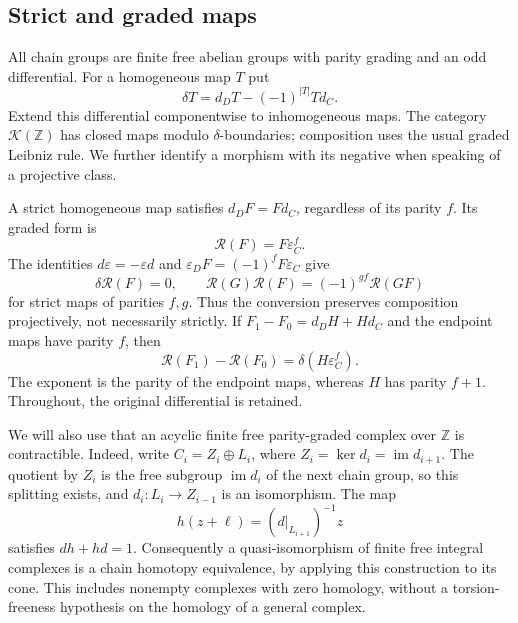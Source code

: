 \documentclass[11pt]{amsart}
\theoremstyle{definition}
\theoremstyle{remark}
\theoremstyle{plain}
\newcommand{\ZZ}{\mathbb Z}
\newcommand{\eps}{\varepsilon}
\newcommand{\cK}{\mathcal K}
\begin{document}
\subsection{Strict and graded maps}\label{sec:algebra}
All chain groups are finite free abelian groups with parity grading
and an odd differential. For a homogeneous map $T$ put
\[
 \delta T=d_DT-(-1)^{|T|}Td_C.
\]
Extend this differential componentwise to inhomogeneous maps.
The category $\cK(\ZZ)$ has closed maps modulo $\delta$-boundaries;
composition uses the usual graded Leibniz rule. We further identify
a morphism with its negative when speaking of a projective class.

A strict homogeneous map satisfies $d_DF=Fd_C$, regardless of its
parity $f$. Its graded form is
\begin{equation}\label{eq:right}
 \mathcal R(F)=F\eps_C^f.
\end{equation}
The identities $d\eps=-\eps d$ and
$\eps_DF=(-1)^fF\eps_C$ give
\begin{equation}\label{eq:right-comp}
 \delta\mathcal R(F)=0,
 \qquad \mathcal R(G)\mathcal R(F)=(-1)^{gf}\mathcal R(GF)
\end{equation}
for strict maps of parities $f,g$. Thus the conversion preserves
composition projectively, not necessarily strictly. If
$F_1-F_0=d_DH+Hd_C$ and the endpoint maps have parity $f$, then
\begin{equation}\label{eq:right-homotopy}
 \mathcal R(F_1)-\mathcal R(F_0)=\delta(H\eps_C^f).
\end{equation}
The exponent is the parity of the endpoint maps, whereas $H$ has
parity $f+1$. Throughout, the original differential is retained.

We will also use that an acyclic finite free parity-graded complex
over $\ZZ$ is contractible. Indeed, write $C_i=Z_i\oplus L_i$,
where $Z_i=\ker d_i=\operatorname{im}d_{i+1}$. The quotient by
$Z_i$ is the free subgroup $\operatorname{im}d_i$ of the next
chain group, so this splitting exists, and $d_i:L_i\to Z_{i-1}$
is an isomorphism. The map
\begin{equation}\label{eq:contraction}
 h(z+\ell)=(d|_{L_{i+1}})^{-1}z
\end{equation}
satisfies $dh+hd=1$. Consequently a quasi-isomorphism of finite
free integral complexes is a chain homotopy equivalence, by applying
this construction to its cone. This includes nonempty complexes
with zero homology, without a torsion-freeness hypothesis on the
homology of a general complex.
\end{document}
